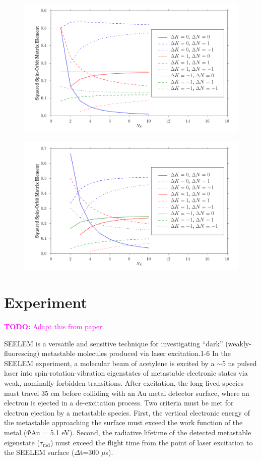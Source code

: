 \documentclass[12pt]{mitthesis}
\newcommand{\TODO} [1]{\textcolor{magenta}{\textbf{TODO:} #1}}
\begin{document}
\begin{figure}
  \caption{}
  \label{fig:rotational-factors-1}
  \centering
  \includegraphics[width=6in]{rotational_factors_k1.png}
\end{figure}

\begin{figure}
  \caption{}
  \label{fig:rotational-factors-2}
  \centering
  \includegraphics[width=6in]{rotational_factors_k2.png}
\end{figure}

\section{Experiment}

\TODO{Adapt this from paper.}

SEELEM is a versatile and sensitive technique for investigating
``dark'' (weakly-fluorescing) metastable molecules produced via laser
excitation.1-6 In the SEELEM experiment, a molecular beam of acetylene
is excited by a $\sim$5 ns pulsed laser into spin-rotation-vibration
eigenstates of metastable electronic states via weak, nominally
forbidden transitions. After excitation, the long-lived species must
travel 35 cm before colliding with an Au metal detector surface, where
an electron is ejected in a de-excitation process. Two criteria must
be met for electron ejection by a metastable species. First, the
vertical electronic energy of the metastable approaching the surface
must exceed the work function of the metal ($\Phi$Au = 5.1
eV). Second, the radiative lifetime of the detected metastable
eigenstate ($\tau_\text{rad}$) must exceed the flight time from the
point of laser excitation to the SEELEM surface ($\Delta$t=300
$\mu$s).
\end{document}

